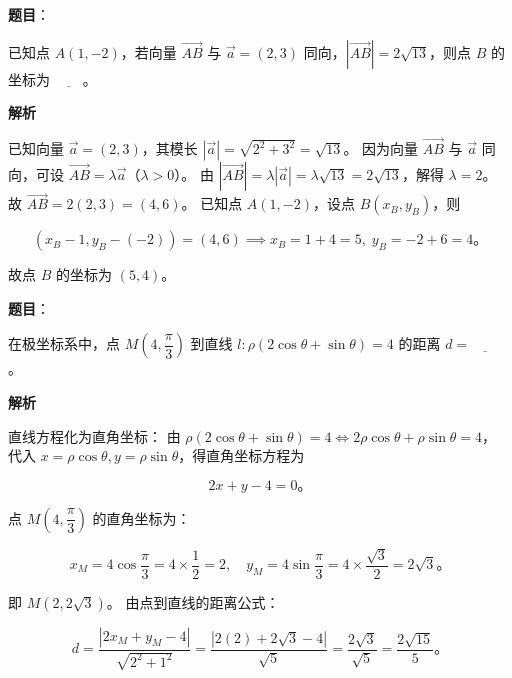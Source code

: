 \begin{answer}

\textbf{题目}：

已知点 $A(1, -2)$，若向量 $\overrightarrow{AB}$ 与 $\vec{a} = (2, 3)$ 同向，$|\overrightarrow{AB}| = 2\sqrt{13}$，则点 $B$ 的坐标为 $\underline{\qquad}$。

\textbf{解析}

已知向量 $\vec{a} = (2, 3)$，其模长 $|\vec{a}| = \sqrt{2^2 + 3^2} = \sqrt{13}$。
因为向量 $\overrightarrow{AB}$ 与 $\vec{a}$ 同向，可设 $\overrightarrow{AB} = \lambda \vec{a}$（$\lambda > 0$）。
由 $|\overrightarrow{AB}| = \lambda |\vec{a}| = \lambda\sqrt{13} = 2\sqrt{13}$，解得 $\lambda = 2$。
故 $\overrightarrow{AB} = 2(2, 3) = (4, 6)$。
已知点 $A(1, -2)$，设点 $B(x_B, y_B)$，则

\nopagebreak[4]
\[
(x_B - 1, y_B - (-2)) = (4, 6) \implies x_B = 1 + 4 = 5,\; y_B = -2 + 6 = 4\mbox{。}
\]

故点 $B$ 的坐标为 $(5, 4)$。


\end{answer}
\begin{answer}

\textbf{题目}：

在极坐标系中，点 $M\left(4, \dfrac{\pi}{3}\right)$ 到直线 $l: \rho(2\cos\theta + \sin\theta) = 4$ 的距离 $d = \underline{\qquad}$。

\textbf{解析}

直线方程化为直角坐标：
由 $\rho(2\cos\theta + \sin\theta) = 4 \iff 2\rho\cos\theta + \rho\sin\theta = 4$，
代入 $x = \rho\cos\theta, y = \rho\sin\theta$，得直角坐标方程为

\nopagebreak[4]
\[
2x + y - 4 = 0\mbox{。}
\]

点 $M\left(4, \dfrac{\pi}{3}\right)$ 的直角坐标为：

\nopagebreak[4]
\[
x_M = 4\cos\dfrac{\pi}{3} = 4 \times \dfrac{1}{2} = 2,\quad y_M = 4\sin\dfrac{\pi}{3} = 4 \times \dfrac{\sqrt{3}}{2} = 2\sqrt{3}\mbox{。}
\]

即 $M(2, 2\sqrt{3})$。
由点到直线的距离公式：

\nopagebreak[4]
\[
d = \dfrac{|2x_M + y_M - 4|}{\sqrt{2^2 + 1^2}} = \dfrac{|2(2) + 2\sqrt{3} - 4|}{\sqrt{5}} = \dfrac{2\sqrt{3}}{\sqrt{5}} = \dfrac{2\sqrt{15}}{5}\mbox{。}
\]


\end{answer}
